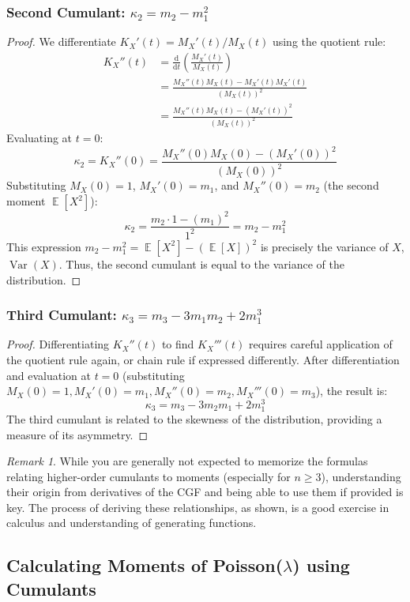 \documentclass[11pt, letterpaper]{article}
\theoremstyle{plain} %
\theoremstyle{definition} %
\theoremstyle{remark} %
\newtheorem{remark}[theorem]{Remark}
\DeclareMathOperator{\E}{\mathbb{E}}
\DeclareMathOperator{\Var}{\mathrm{Var}}
\newcommand{\dee}{\mathrm{d}} %
\begin{document}
\subsubsection{Second Cumulant: $\kappa_2 = m_2 - m_1^2$}
\begin{proof}
We differentiate $K_X'(t) = M_X'(t)/M_X(t)$ using the quotient rule:
\begin{align*}
K_X''(t) &= \frac{\dee}{\dee t}\left(\frac{M_X'(t)}{M_X(t)}\right) \\
&= \frac{M_X''(t)M_X(t) - M_X'(t)M_X'(t)}{(M_X(t))^2} \\
&= \frac{M_X''(t)M_X(t) - (M_X'(t))^2}{(M_X(t))^2}
\end{align*}
Evaluating at $t=0$:
\[ \kappa_2 = K_X''(0) = \frac{M_X''(0)M_X(0) - (M_X'(0))^2}{(M_X(0))^2} \]
Substituting $M_X(0)=1$, $M_X'(0)=m_1$, and $M_X''(0)=m_2$ (the second moment $\E[X^2]$):
\[ \kappa_2 = \frac{m_2 \cdot 1 - (m_1)^2}{1^2} = m_2 - m_1^2 \]
This expression $m_2 - m_1^2 = \E[X^2] - (\E[X])^2$ is precisely the variance of $X$, $\Var(X)$.
Thus, the second cumulant is equal to the variance of the distribution.
\end{proof}

\subsubsection{Third Cumulant: $\kappa_3 = m_3 - 3m_1m_2 + 2m_1^3$}
\begin{proof}
Differentiating $K_X''(t)$ to find $K_X'''(t)$ requires careful application of the quotient rule again, or chain rule if expressed differently. After differentiation and evaluation at $t=0$ (substituting $M_X(0)=1, M_X'(0)=m_1, M_X''(0)=m_2, M_X'''(0)=m_3$), the result is:
\[ \kappa_3 = m_3 - 3m_2m_1 + 2m_1^3 \]
The third cumulant is related to the skewness of the distribution, providing a measure of its asymmetry.
\end{proof}
\begin{remark}
    While you are generally not expected to memorize the formulas relating higher-order cumulants to moments (especially for $n \ge 3$), understanding their origin from derivatives of the CGF and being able to use them if provided is key. The process of deriving these relationships, as shown, is a good exercise in calculus and understanding of generating functions.
\end{remark}

\subsection{Calculating Moments of Poisson($\lambda$) using Cumulants}
\label{subsec:poisson_moments_via_cumulants}
\end{document}
